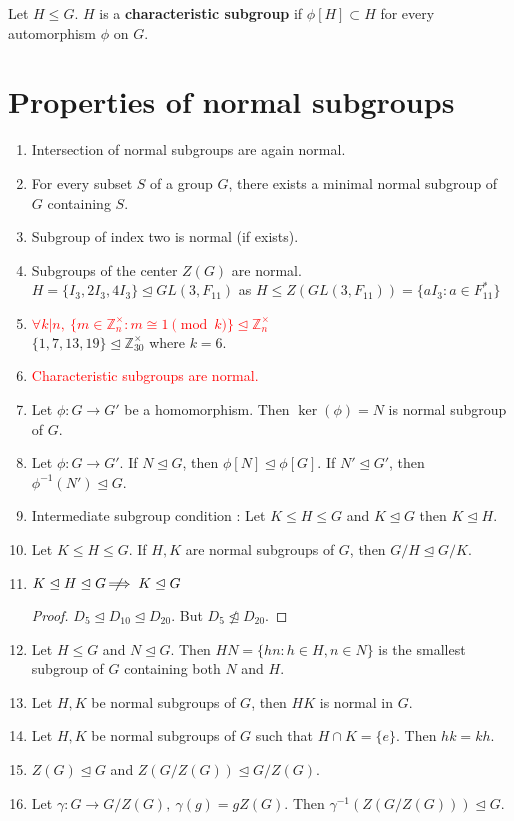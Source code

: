 \begin{definition}
	Let $H \le G$. $H$ is a \textbf{characteristic subgroup} if $\phi[H] \subset H$ for every automorphism $\phi$ on $G$.
\end{definition}

\section{Properties of normal subgroups}
\begin{enumerate}
	\item Intersection of normal subgroups are again normal.
	\item For every subset $S$ of a group $G$, there exists a minimal normal subgroup of $G$ containing $S$.
	\item Subgroup of index two is normal (if exists).
	\item Subgroups of the center $Z(G)$ are normal.\\
		$H = \{ I_3,2I_3,4I_3 \} \trianglelefteq GL(3,F_{11})$ as $H \le Z(GL(3,F_{11})) = \{ aI_3 : a \in F^\ast_{11} \}$
	\item \textcolor{red}{$\forall k|n,\ \{ m \in \mathbb{Z}_n^\times : m \cong 1 \pmod{k} \} \trianglelefteq \mathbb{Z}_n^\times$}\\
		$\{ 1,7,13,19 \} \trianglelefteq \mathbb{Z}_{30}^\times$ where $k = 6$.
	\item \textcolor{red}{Characteristic subgroups are normal.}
	\item Let $\phi : G \to G'$ be a homomorphism. Then $\ker(\phi) = N$ is normal subgroup of $G$.
	\item Let $\phi : G \to G'$.  If $N \trianglelefteq G$, then $\phi[N] \trianglelefteq \phi[G]$.  If $N' \trianglelefteq G'$, then $\phi^{-1}(N') \trianglelefteq G$.
	\item Intermediate subgroup condition : Let $K \le H \le G$ and $K \trianglelefteq G$ then $K \trianglelefteq H$.
	\item Let $K \le H \le G$. If $H,K$ are normal subgroups of $G$, then $G/H \trianglelefteq G/K$.
	\item $K \trianglelefteq H \trianglelefteq G \;\not\nobreak\!\!\!\!\implies K \trianglelefteq G$
		\begin{proof}
			$D_5 \trianglelefteq D_{10} \trianglelefteq D_{20}$. But $D_5 \not\trianglelefteq D_{20}$.
		\end{proof}
	\item Let $H \le G$ and $N \trianglelefteq G$. Then $HN = \{ hn : h \in H, n \in N\}$ is the smallest subgroup of $G$ containing both $N$ and $H$.
	\item Let $H,K$ be normal subgroups of $G$, then $HK$ is normal in $G$.
	\item Let $H,K$ be normal subgroups of $G$ such that $H \cap K = \{ e \}$. Then $hk = kh$.
	\item $Z(G) \trianglelefteq G$ and $Z(G/Z(G)) \trianglelefteq G/Z(G)$.
	\item Let $\gamma : G \to G/Z(G),\ \gamma(g) = gZ(G)$. Then $\gamma^{-1}(Z(G/Z(G))) \trianglelefteq G$.
\end{enumerate}

